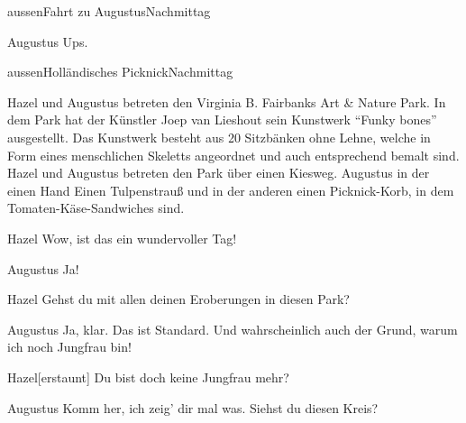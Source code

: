 \documentclass[12pt]{article}
\begin{document}
\begin{scene}{aussen}{Fahrt zu Augustus}{Nachmittag}

        \begin{dialog}[beschämt]{Augustus}
            Ups.
        \end{dialog}
    \end{scene}

    \begin{scene}{aussen}{Holländisches Picknick}{Nachmittag}
        \begin{scenedescription}
            \gls{Hazel} und \gls{Augustus} betreten den Virginia B. Fairbanks Art \& Nature Park.
            In dem Park hat der Künstler Joep van Lieshout sein Kunstwerk ``Funky bones'' ausgestellt.
            Das Kunstwerk besteht aus 20 Sitzbänken ohne Lehne, welche in Form eines menschlichen Skeletts angeordnet und auch entsprechend bemalt sind.
            \gls{Hazel} und \gls{Augustus} betreten den Park über einen Kiesweg.
            \gls{Augustus} in der einen Hand Einen Tulpenstrauß und in der anderen einen Picknick-Korb, in dem Tomaten-Käse-Sandwiches sind.
        \end{scenedescription}

        \begin{dialog}{Hazel}
            Wow, ist das ein wundervoller Tag!
        \end{dialog}

        \begin{dialog}{Augustus}
            Ja!
        \end{dialog}

        \begin{dialog}{Hazel}
            Gehst du mit allen deinen Eroberungen in diesen Park?
        \end{dialog}

        \begin{dialog}{Augustus}
            Ja, klar.
            Das ist Standard.
            Und wahrscheinlich auch der Grund, warum ich noch Jungfrau bin!
        \end{dialog}

        \begin{dialog}{Hazel}[erstaunt]
            Du bist doch keine Jungfrau mehr?
        \end{dialog}

        \begin{dialog}{Augustus}
            Komm her, ich zeig' dir mal was.
            Siehst du diesen Kreis?
        \end{dialog}


\end{scene}
\end{document}
